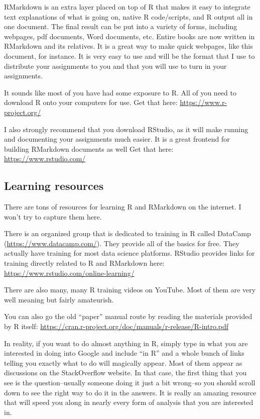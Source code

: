 \documentclass[
]{book}
\begin{document}
RMarkdown is an extra layer placed on top of R that makes it easy to integrate text explanations of what is going on, native R code/scripts, and R output all in one document. The final result can be put into a variety of forms, including webpages, pdf documents, Word documents, etc. Entire books are now written in RMarkdown and its relatives. It is a great way to make quick webpages, like this document, for instance. It is very easy to use and will be the format that I use to distribute your assignments to you and that you will use to turn in your assignments.

It sounds like most of you have had some exposure to R. All of you need to download R onto your computers for use. Get that here:
\url{https://www.r-project.org/}

I also strongly recommend that you download RStudio, as it will make running and documenting your assignments much easier. It is a great frontend for building RMarkdown documents as well Get that here:
\url{https://www.rstudio.com/}

\hypertarget{learning-resources}{%
\subsection{Learning resources}\label{learning-resources}}

There are tons of resources for learning R and RMarkdown on the internet. I won't try to capture them here.

There is an organized group that is dedicated to training in R called DataCamp (\url{https://www.datacamp.com/}). They provide all of the basics for free. They actually have training for most data science platforms. RStudio provides links for training directly related to R and RMarkdown here:
\url{https://www.rstudio.com/online-learning/}

There are also many, many R training videos on YouTube. Most of them are very well meaning but fairly amateurish.

You can also go the old ``paper'' manual route by reading the materials provided by R itself:
\url{https://cran.r-project.org/doc/manuals/r-release/R-intro.pdf}

In reality, if you want to do almost anything in R, simply type in what you are interested in doing into Google and include ``in R'' and a whole bunch of links telling you exactly what to do will magically appear. Most of them appear as discussions on the StackOverflow website. In that case, the first thing that you see is the question--usually someone doing it just a bit wrong--so you should scroll down to see the right way to do it in the answers. It is really an amazing resource that will speed you along in nearly every form of analysis that you are interested in.
\end{document}
